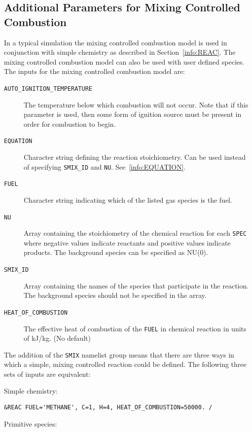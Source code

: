 \documentclass[11pt]{book}
\newcommand{\ct}{\tt\small}
\begin{document}
\subsection{Additional Parameters for Mixing Controlled Combustion}
\label{info:mixing}

In a typical simulation the mixing controlled combustion model is used in conjunction with simple chemistry as described in Section~\ref{info:REAC}.
The mixing controlled combustion model can also be used with user defined species.  The inputs for the mixing controlled combustion model are:

\begin{description}
\item[{\ct AUTO\_IGNITION\_TEMPERATURE}] The temperature below which combustion will not occur.  Note that if this parameter is used,
then some form of ignition source must be present in order for combustion to begin.
\item[{\ct EQUATION}] Character string defining the reaction stoichiometry.  Can be used instead of specifying {\ct SMIX\_ID} and {\ct NU}.  See~\ref{info:EQUATION}.
\item[{\ct FUEL}] Character string indicating which of the listed gas species is the fuel.
\item[{\ct NU}] Array containing the stoichiometry of the chemical reaction for each {\ct SPEC} where negative values indicate reactants and positive values indicate products.
The background species can be specified as NU(0).
\item[{\ct SMIX\_ID}] Array containing the names of the species that participate in the reaction.  The background species should not be specified in the array.
\item[{\ct HEAT\_OF\_COMBUSTION}] The effective heat of combustion of the {\ct FUEL} in chemical reaction in units of kJ/kg. (No default)
\end{description}

The addition of the {\ct SMIX} namelist group means that there are three ways in which a simple, mixing controlled reaction could be defined.
The following three sets of inputs are equivalent:

Simple chemistry:

\footnotesize
\begin{verbatim}
&REAC FUEL='METHANE', C=1, H=4, HEAT_OF_COMBUSTION=50000. /
\end{verbatim} \normalsize

Primitive species:
\end{document}
